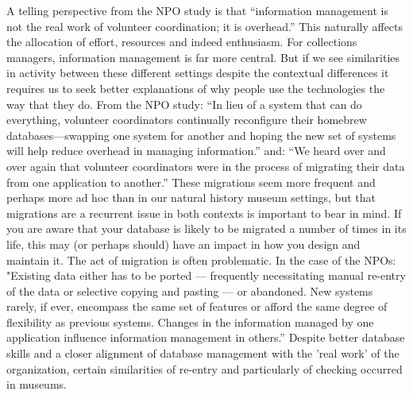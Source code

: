 A telling perspective from the NPO study is that “information management is not the real work of volunteer coordination; it is overhead.” This naturally affects the allocation of effort, resources and indeed enthusiasm. For collections managers, information management is far more central. But if we see similarities in activity between these different settings despite the contextual differences it requires us to seek better explanations of why people use the technologies the way that they do. From the NPO study: “In lieu of a system that can do everything, volunteer coordinators continually reconfigure their homebrew databases—swapping one system for another and hoping the new set of systems will help reduce overhead in managing information.”  and: “We heard over and over again that volunteer coordinators were in the process of migrating their data from one application to another.” These migrations seem more frequent and perhaps more ad hoc than in our natural history museum settings, but that migrations are a recurrent issue in both contexts is important to bear in mind. If you are aware that your database is likely to be migrated a number of times in its life, this may (or perhaps should) have an impact in how you design and maintain it. The act of migration is often problematic. In the case of the NPOs: "Existing data either has to be ported — frequently necessitating manual re-entry of the data or selective copying and pasting — or abandoned. New systems rarely, if ever, encompass the same set of features or afford the same degree of flexibility as previous systems. Changes in the information managed by one application influence information management in others.” Despite better database skills and a closer alignment of database management with the 'real work' of the organization, certain similarities of re-entry and particularly of checking occurred in museums.

